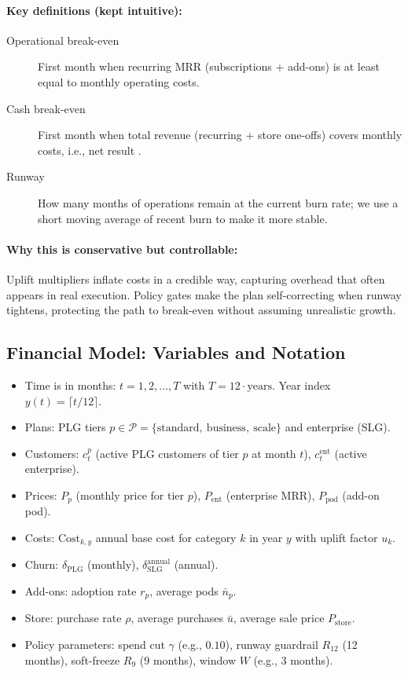 \documentclass[11pt, a4paper, oneside]{article}
\begin{document}
\paragraph{Key definitions (kept intuitive):}
\begin{description}
\item[Operational break-even] First month when recurring MRR (subscriptions + add-ons) is at least equal to monthly operating costs.
\item[Cash break-even] First month when total revenue (recurring + store one-offs) covers mon\-th\-ly costs, i.e., net result .
\item[Runway] How many months of operations remain at the current burn rate; we use a short moving average of recent burn to make it more stable.
\end{description}

\paragraph{Why this is conservative but controllable:}
Uplift multipliers inflate costs in a credible way, capturing overhead that often appears in real execution. Policy gates make the plan self-correcting when runway tightens, protecting the path to break-even without assuming unrealistic growth.

\subsection{Financial Model: Variables and Notation}
\begin{itemize}
  \item Time is in months: $t = 1,2,\dots,T$ with $T = 12 \cdot \text{years}$. Year index $y(t) = \lceil t/12 \rceil$.
  \item Plans: PLG tiers $p \in \mathcal{P}=\{\text{standard},\ \text{business},\ \text{scale}\}$ and enterprise (SLG).
  \item Customers: $c^p_t$ (active PLG customers of tier $p$ at month $t$), $c^{\mathrm{ent}}_t$ (active enterprise).
  \item Prices: $P_p$ (monthly price for tier $p$), $P_{\mathrm{ent}}$ (enterprise MRR), $P_{\mathrm{pod}}$ (add-on pod).
  \item Costs: $\mathrm{Cost}_{k,y}$ annual base cost for category $k$ in year $y$ with uplift factor $u_k$.
  \item Churn: $\delta_{\mathrm{PLG}}$ (monthly), $\delta^{\mathrm{annual}}_{\mathrm{SLG}}$ (annual). 
  \item Add-ons: adoption rate $r_p$, average pods $\bar{n}_p$.
  \item Store: purchase rate $\rho$, average purchases $\bar{u}$, average sale price $P_{\mathrm{store}}$.
  \item Policy parameters: spend cut $\gamma$ (e.g., $0.10$), runway guardrail $R_{12}$ (12 months), soft-freeze $R_{9}$ (9 months), window $W$ (e.g., $3$ months).
\end{itemize}
\end{document}
